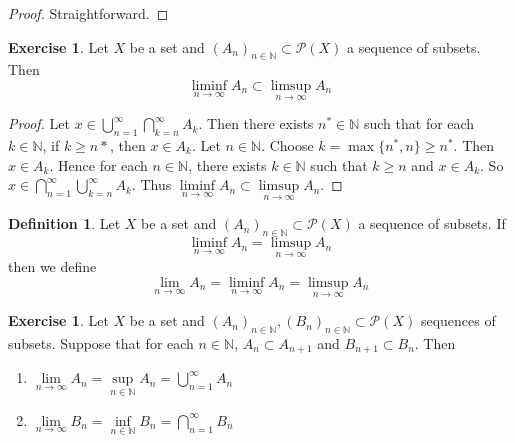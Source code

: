 \documentclass[12pt]{amsart}
\theoremstyle{definition}
\newtheorem{defn}[definition]{Definition}
\newtheorem{ex}[definition]{Exercise}
\newcommand{\N}{\mathbb{N}}
\newcommand{\MP}{\mathcal{P}}
\newcommand{\limn}{\lim \limits_{n \rightarrow \infty}}
\newcommand{\lex}[1]{\label{ex:#1}}
\newcommand{\ld}[1]{\label{defn:#1}}
\begin{document}
	\begin{proof}
		Straightforward.
	\end{proof}
	
	\begin{ex} \lex{00000} 
		Let $X$ be a set and $(A_n)_{n \in \N} \subset \MP(X)$ a sequence of subsets. Then $$\liminf_{n \rightarrow \infty} A_n \subset \limsup_{n \rightarrow \infty} A_n$$
	\end{ex}
	
	\begin{proof}
		Let $x \in \bigcup\limits_{n=1}^{\infty} \bigcap\limits_{k =n}^{\infty} A_k$. Then there exists $n^* \in \N$ such that for each $k \in \N$, if $k \geq n*$, then $x \in A_k$. Let $n \in \N$. Choose $k = \max\{n^*,n\} \geq n^*$. Then $x \in A_k$. Hence for each $n \in \N$, there exists $k \in \N$ such that $k \geq n$ and $x \in A_k$. So $x \in \bigcap\limits_{n=1}^{\infty} \bigcup\limits_{k=n}^{\infty} A_k$. Thus $\liminf\limits_{n \rightarrow \infty}A_n \subset \limsup\limits_{n \rightarrow \infty}A_n$.
	\end{proof}
	
	\begin{defn} \ld{00000} 
		Let $X$ be a set and $(A_n)_{n \in \N} \subset \MP(X)$ a sequence of subsets. If $$\liminf_{n \rightarrow \infty} A_n = \limsup_{n \rightarrow \infty} A_n$$ then we define $$\lim_{n \rightarrow \infty}A_n = \liminf_{n \rightarrow \infty} A_n = \limsup_{n \rightarrow \infty} A_n$$ 
	\end{defn}
	
	\begin{ex} \lex{00000} 
		Let $X$ be a set and $(A_n)_{n \in \N}, (B_n)_{n \in \N} \subset \MP(X)$ sequences of subsets. Suppose that for each $n \in \N$, $A_n \subset A_{n+1}$ and $B_{n+1} \subset B_n$. Then 
		\begin{enumerate}
			\item $\limn A_n = \sup\limits_{n \in \N}A_n = \bigcup\limits_{n=1}^{\infty}A_n$
			\item $\limn B_n = \inf\limits_{n \in \N}B_n = \bigcap\limits_{n=1}^{\infty}B_n$
		\end{enumerate}
	\end{ex}
	
\end{document}
